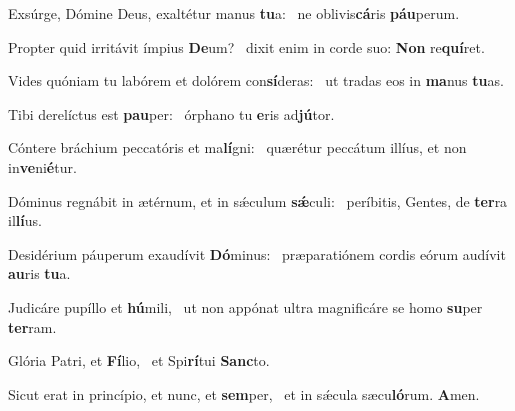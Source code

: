 \item Exsúrge, Dómine Deus, exaltétur manus \textbf{tu}a:~\psstar{}  ne oblivis\textbf{cá}ris \textbf{páu}perum.
\item Propter quid irritávit ímpius \textbf{De}um?~\psstar{} dixit enim in corde suo: \textbf{Non} re\textbf{quí}ret.
\item Vides quóniam tu labórem et dolórem con\textbf{sí}deras:~\psstar{} ut tradas eos in \textbf{ma}nus \textbf{tu}as.
\item Tibi derelíctus est \textbf{pau}per:~\psstar{} órphano tu \textbf{e}ris ad\textbf{jú}tor.
\item Cóntere bráchium peccatóris et ma\textbf{lí}gni:~\psstar{} quærétur peccátum illíus, et non in\textbf{ve}ni\textbf{é}tur.
\item Dóminus regnábit in ætérnum, et in sǽculum \textbf{sǽ}culi:~\psstar{} períbitis, Gentes, de \textbf{ter}ra il\textbf{lí}us.
\item Desidérium páuperum exaudívit \textbf{Dó}minus:~\psstar{} præparatiónem cordis eórum audívit \textbf{au}ris \textbf{tu}a.
\item Judicáre pupíllo et \textbf{hú}mili,~\psstar{} ut non appónat ultra magnificáre se homo \textbf{su}per \textbf{ter}ram.
\item Glória Patri, et \textbf{Fí}lio,~\psstar{} et Spi\textbf{rí}tui \textbf{Sanc}to.
\item Sicut erat in princípio, et nunc, et \textbf{sem}per,~\psstar{} et in sǽcula sæcu\textbf{ló}rum. \textbf{A}men.
